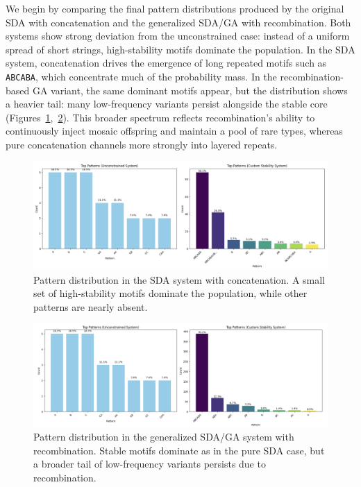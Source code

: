 \documentclass[life,article,submit,pdftex,moreauthors]{Definitions/mdpi}
\begin{document}
We begin by comparing the final pattern distributions produced by the original SDA with concatenation and the generalized SDA/GA with recombination. Both systems show strong deviation from the unconstrained case: instead of a uniform spread of short strings, high-stability motifs dominate the population. In the SDA system, concatenation drives the emergence of long repeated motifs such as \texttt{ABCABA}, which concentrate much of the probability mass. In the recombination-based GA variant, the same dominant motifs appear, but the distribution shows a heavier tail: many low-frequency variants persist alongside the stable core (Figures~\ref{fig:concat-patterns},~\ref{fig:ga-patterns}). This broader spectrum reflects recombination’s ability to continuously inject mosaic offspring and maintain a pool of rare types, whereas pure concatenation channels more strongly into layered repeats.

\begin{figure}[H]
    \centering
    \includegraphics[width=1\textwidth]{SDA-concat-patterns.png}
    \caption{Pattern distribution in the SDA system with concatenation. A small set of high-stability motifs dominate the population, while other patterns are nearly absent.}
    \label{fig:concat-patterns}
\end{figure}

\begin{figure}[H]
    \centering
    \includegraphics[width=1\textwidth]{SDA-GA-patterns.png}
    \caption{Pattern distribution in the generalized SDA/GA system with recombination. Stable motifs dominate as in the pure SDA case, but a broader tail of low-frequency variants persists due to recombination.}
    \label{fig:ga-patterns}
\end{figure}
\end{document}
